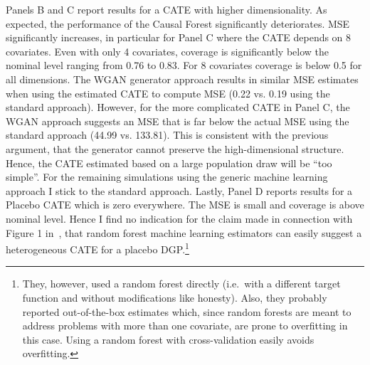 \documentclass[11pt, a4paper, leqno]{article}
\begin{document}
Panels B and C report results for a CATE with higher dimensionality. As expected, the performance of the Causal Forest significantly deteriorates.
MSE significantly increases, in particular for Panel C where the CATE depends on 8 covariates.
Even with only 4 covariates, coverage is significantly below the nominal level ranging from 0.76 to 0.83. For 8 covariates coverage is below 0.5 for all dimensions.
The WGAN generator approach results in similar MSE estimates when using the estimated CATE to compute MSE (0.22 vs. 0.19 using the standard approach).
However, for the more complicated CATE in Panel C, the WGAN approach suggests an MSE that is far below the actual MSE using the standard approach (44.99 vs. 133.81).
This is consistent with the previous argument, that the generator cannot preserve the high-dimensional structure. Hence, the CATE estimated based on a large population draw will be ``too simple''.
For the remaining simulations using the generic machine learning approach I stick to the standard approach.
Lastly, Panel D reports results for a Placebo CATE which is zero everywhere. The MSE is small and coverage is above nominal level.
Hence I find no indication for the claim made in connection with Figure 1 in~\citet{chernozhukov2023genml}, that random forest machine learning estimators can easily suggest a heterogeneous CATE for a placebo DGP\@.\footnote{They, however, used a random forest directly (i.e.\ with a different target function and without modifications like honesty). Also, they probably reported out-of-the-box estimates which, since random forests are meant to address problems with more than one covariate, are prone to overfitting in this case. Using a random forest with cross-validation easily avoids overfitting.}
\end{document}
